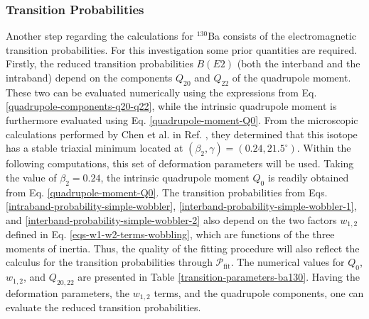 \subsubsection{Transition Probabilities}

Another step regarding the calculations for $^{130}$Ba consists of the electromagnetic transition probabilities. For this investigation some prior quantities are required. Firstly, the reduced transition probabilities $B(E2)$ (both the interband and the intraband) depend on the components $Q_{20}$ and $Q_{22}$ of the quadrupole moment. These two can be evaluated numerically using the expressions from Eq. \ref{quadrupole-components-q20-q22}, while the intrinsic quadrupole moment is furthermore evaluated using Eq. \ref{quadrupole-moment-Q0}. From the microscopic calculations performed by Chen et al. in Ref. \cite{chen2019transverse}, they determined that this isotope has a stable triaxial minimum located at $(\beta_2,\gamma)=(0.24,21.5^\circ)$. Within the following computations, this set of deformation parameters will be used. Taking the value of $\beta_2=0.24$, the intrinsic quadrupole moment $Q_0$ is readily obtained from Eq. \ref{quadrupole-moment-Q0}. The transition probabilities from Eqs. \ref{intraband-probability-simple-wobbler}, \ref{interband-probability-simple-wobbler-1}, and \ref{interband-probability-simple-wobbler-2} also depend on the two factors $w_{1,2}$ defined in Eq. \ref{eqs-w1-w2-terms-wobbling}, which are functions of the three moments of inertia. Thus, the quality of the fitting procedure will also reflect the calculus for the transition probabilities through $\mathcal{P}_\text{fit}$. The numerical values for $Q_0$, $w_{1,2}$, and $Q_{20,22}$ are presented in Table \ref{transition-parameters-ba130}. Having the deformation parameters, the $w_{1,2}$ terms, and the quadrupole components, one can evaluate the reduced transition probabilities. 


